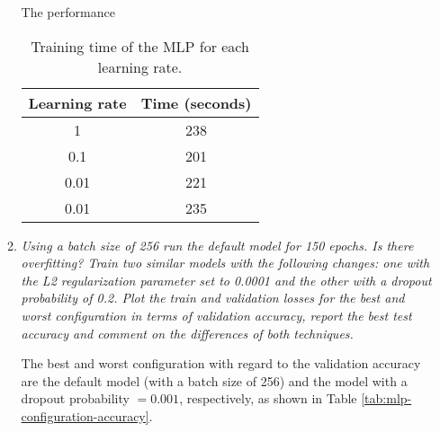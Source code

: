 \documentclass[12pt]{article}
\begin{document}
\begin{enumerate}[leftmargin=\labelsep]
\begin{enumerate}[label=\alph*)]
                    The performance

                    \begin{table}[H]
                        \centering
                        \begin{tabular}{|c|c|}
                            \hline
                            Learning rate & Time (seconds) \\ \hline
                            1             & 238            \\ \hline
                            0.1           & 201            \\ \hline
                            0.01          & 221            \\ \hline
                            0.01          & 235            \\ \hline
                        \end{tabular}
                        \caption{Training time of the MLP for each learning rate.}
                        \label{tab:mlp-learning-rate-time}
                    \end{table}

              \item \textit{Using a batch size of 256 run the default model for 150 epochs. Is there
                        overfitting?
                        Train two similar models with the following changes: one with the L2
                        regularization parameter set to 0.0001 and the other with a dropout probability of 0.2.
                        Plot the train and validation losses for the best and worst configuration in terms of
                        validation accuracy, report the best test accuracy and comment on the differences of
                        both techniques.}

                    \vspace{12pt}

                    The best and worst configuration with regard to the validation accuracy are the default model (with a batch size of 256) and the model with a dropout probability $= 0.001$, respectively, as shown in Table \ref{tab:mlp-configuration-accuracy}.


\end{enumerate}
\end{enumerate}
\end{document}
